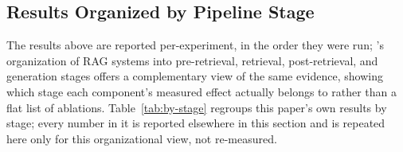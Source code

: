 \documentclass[a4paper,twoside]{article}
\begin{document}
\subsection{Results Organized by Pipeline Stage}
\label{subsec:by-stage}

The results above are reported per-experiment, in the order they were run; \citet{huang2026survey}'s organization of RAG systems into pre-retrieval, retrieval, post-retrieval, and generation stages offers a complementary view of the same evidence, showing which stage each component's measured effect actually belongs to rather than a flat list of ablations. Table~\ref{tab:by-stage} regroups this paper's own results by stage; every number in it is reported elsewhere in this section and is repeated here only for this organizational view, not re-measured.
\end{document}
